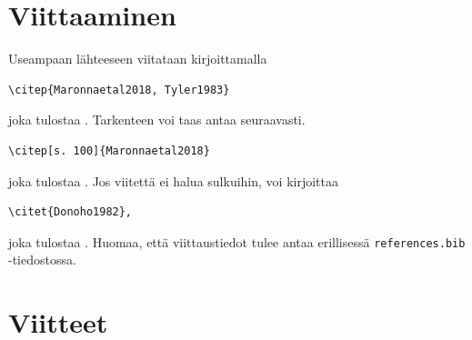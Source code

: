 \documentclass[a4paper,12 pt]{article}
\theoremstyle{plain}
\theoremstyle{definition}
\theoremstyle{remark}
\numberwithin{equation}{section}
\numberwithin{figure}{section}
\begin{document}
\section{Viittaaminen}
Useampaan lähteeseen viitataan kirjoittamalla 

\begin{verbatim}
\citep{Maronnaetal2018, Tyler1983}    
\end{verbatim}
joka tulostaa \citep{Maronnaetal2018, Tyler1983}. Tarkenteen voi taas antaa seuraavasti. 

\begin{verbatim}
\citep[s. 100]{Maronnaetal2018}    
\end{verbatim}
joka tulostaa \citep[s. 100]{Maronnaetal2018}. Jos viitettä ei halua sulkuihin, voi kirjoittaa 

\begin{verbatim}
\citet{Donoho1982},    
\end{verbatim}
joka tulostaa \citet{Donoho1982}. Huomaa, että viittaustiedot tulee antaa erillisessä \texttt{references.bib} -tiedostossa.    

\section*{Viitteet}

\printbibliography[heading=none]
\end{document}
